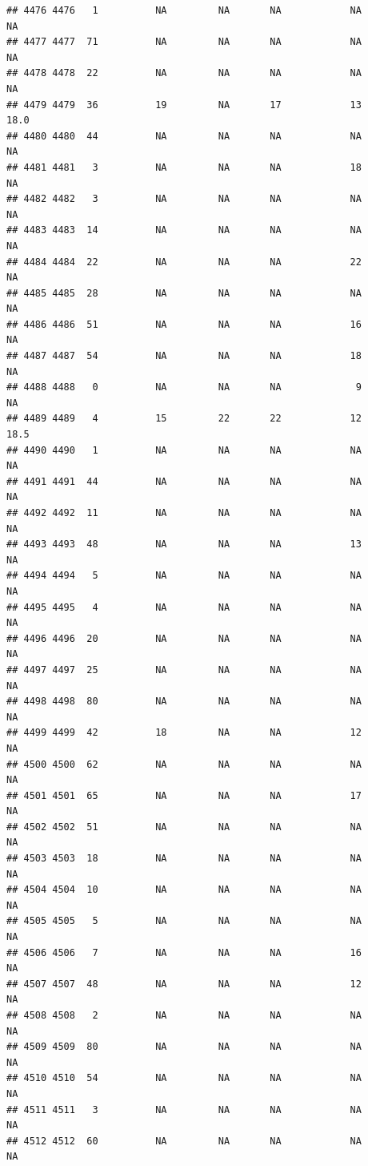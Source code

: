 \documentclass[man]{apa6}
\begin{document}
\begin{verbatim}
## 4476 4476   1          NA         NA       NA            NA       NA
## 4477 4477  71          NA         NA       NA            NA       NA
## 4478 4478  22          NA         NA       NA            NA       NA
## 4479 4479  36          19         NA       17            13     18.0
## 4480 4480  44          NA         NA       NA            NA       NA
## 4481 4481   3          NA         NA       NA            18       NA
## 4482 4482   3          NA         NA       NA            NA       NA
## 4483 4483  14          NA         NA       NA            NA       NA
## 4484 4484  22          NA         NA       NA            22       NA
## 4485 4485  28          NA         NA       NA            NA       NA
## 4486 4486  51          NA         NA       NA            16       NA
## 4487 4487  54          NA         NA       NA            18       NA
## 4488 4488   0          NA         NA       NA             9       NA
## 4489 4489   4          15         22       22            12     18.5
## 4490 4490   1          NA         NA       NA            NA       NA
## 4491 4491  44          NA         NA       NA            NA       NA
## 4492 4492  11          NA         NA       NA            NA       NA
## 4493 4493  48          NA         NA       NA            13       NA
## 4494 4494   5          NA         NA       NA            NA       NA
## 4495 4495   4          NA         NA       NA            NA       NA
## 4496 4496  20          NA         NA       NA            NA       NA
## 4497 4497  25          NA         NA       NA            NA       NA
## 4498 4498  80          NA         NA       NA            NA       NA
## 4499 4499  42          18         NA       NA            12       NA
## 4500 4500  62          NA         NA       NA            NA       NA
## 4501 4501  65          NA         NA       NA            17       NA
## 4502 4502  51          NA         NA       NA            NA       NA
## 4503 4503  18          NA         NA       NA            NA       NA
## 4504 4504  10          NA         NA       NA            NA       NA
## 4505 4505   5          NA         NA       NA            NA       NA
## 4506 4506   7          NA         NA       NA            16       NA
## 4507 4507  48          NA         NA       NA            12       NA
## 4508 4508   2          NA         NA       NA            NA       NA
## 4509 4509  80          NA         NA       NA            NA       NA
## 4510 4510  54          NA         NA       NA            NA       NA
## 4511 4511   3          NA         NA       NA            NA       NA
## 4512 4512  60          NA         NA       NA            NA       NA

\end{verbatim}
\end{document}
